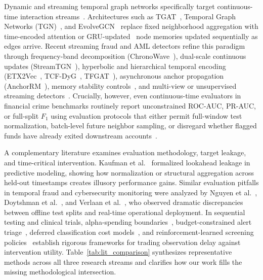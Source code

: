 \documentclass[pdflatex,sn-mathphys,Numbered]{sn-jnl}
\theoremstyle{thmstyleone}
\begin{document}
Dynamic and streaming temporal graph networks specifically target continuous-time interaction streams~\cite{wu2022phishers,xu2020tgat,rossi2020tgn,pareja2020evolvegcn}. Architectures such as TGAT~\cite{xu2020tgat}, Temporal Graph Networks (TGN)~\cite{rossi2020tgn}, and EvolveGCN~\cite{pareja2020evolvegcn} replace fixed neighborhood aggregation with time-encoded attention or GRU-updated~\cite{cho2014gru} node memories updated sequentially as edges arrive. Recent streaming fraud and AML detectors refine this paradigm through frequency-band decomposition (ChronoWave~\cite{lin2026chronowave}), dual-scale continuous updates (StreamTGN~\cite{streamtgn2026}), hyperbolic and hierarchical temporal encoding (ETX2Vec~\cite{lu2026etx2vec}, TCF-DyG~\cite{li2026tcfdyg}, TFGAT~\cite{li2025tfgat}), asynchronous anchor propagation (AnchorRM~\cite{anchorrm2026}), memory stability controls~\cite{dai2025memfreezing,zhou2025badgnn,su2024pres}, and multi-view or unsupervised streaming detectors~\cite{rico2026taml,chen2025mdst,zhou2025unsup,yang2025generaldyg,kasula2025ajk,abolfadl2026kontograph,gounoue2025tempt,su2024temporal,lamport1978clocks}. Crucially, however, even continuous-time evaluators in financial crime benchmarks routinely report unconstrained ROC-AUC, PR-AUC, or full-split $F_1$ using evaluation protocols that either permit full-window test normalization, batch-level future neighbor sampling, or disregard whether flagged funds have already exited downstream accounts~\cite{digennaro2025amatriciana,heijmans2026robust,oztas2023samld}.

A complementary literature examines evaluation methodology, target leakage, and time-critical intervention. Kaufman et al.~\cite{kaufman2012leakage} formalized lookahead leakage in predictive modeling, showing how normalization or structural aggregation across held-out timestamps creates illusory performance gains. Similar evaluation pitfalls in temporal fraud and cybersecurity monitoring were analyzed by Nguyen et al.~\cite{nguyen2022future}, Doytshman et al.~\cite{doytshman2023fraudability}, and Verlaan et al.~\cite{verlaan2025lasgnn}, who observed dramatic discrepancies between offline test splits and real-time operational deployment. In sequential testing and clinical trials, alpha-spending boundaries~\cite{lan1983alpha}, budget-constrained alert triage~\cite{sharma2023tdap}, deferred classification cost models~\cite{mori2018early,jeon2025hia}, and reinforcement-learned screening policies~\cite{shen2020dqn,daniluk2023global,maganti2026liability,vandenbeukel2026tide} establish rigorous frameworks for trading observation delay against intervention utility. Table~\ref{tab:lit_comparison} synthesizes representative methods across all three research streams and clarifies how our work fills the missing methodological intersection.
\end{document}
